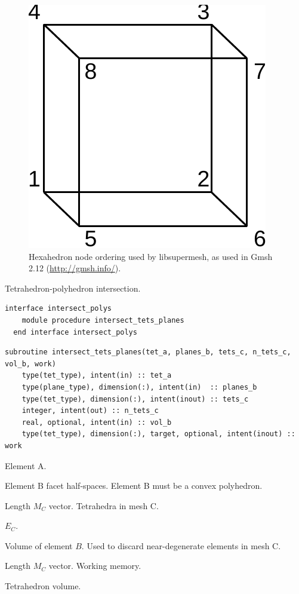 \documentclass{article}
\begin{document}
\begin{figure}\begin{centering}
  \includegraphics[height=0.25\textwidth]{doc/hex_ordering}
  \caption{Hexahedron node ordering used by libsupermesh, as used in
           Gmsh 2.12 (\url{http://gmsh.info/}).}\label{fig:hex_ordering}
\end{centering}\end{figure}

\noindent Tetrahedron-polyhedron intersection.

\begin{lstlisting}[language=FORTRAN]
  interface intersect_polys
    module procedure intersect_tets_planes
  end interface intersect_polys
\end{lstlisting}
  
\begin{lstlisting}[language=FORTRAN]
  subroutine intersect_tets_planes(tet_a, planes_b, tets_c, n_tets_c, vol_b, work)
    type(tet_type), intent(in) :: tet_a
    type(plane_type), dimension(:), intent(in)  :: planes_b
    type(tet_type), dimension(:), intent(inout) :: tets_c
    integer, intent(out) :: n_tets_c
    real, optional, intent(in) :: vol_b
    type(tet_type), dimension(:), target, optional, intent(inout) :: work
\end{lstlisting}

\begin{description}[font=\ttfamily\bfseries,leftmargin=2.2\parindent,labelindent=1.7\parindent,noitemsep]
  \item[tet\_a] Element A.
  \item[planes\_b] Element B facet half-spaces. Element B must be a convex
    polyhedron.
  \item[tets\_c] Length $M_C$ vector. Tetrahedra in mesh C.
  \item[n\_tets\_c] $E_C$.
  \item[vol\_b] Volume of element $B$. Used to discard near-degenerate elements
    in mesh C.
  \item[work] Length $M_C$ vector. Working memory.
\end{description}

\noindent Tetrahedron volume.
\end{document}
